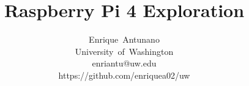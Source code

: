 \documentclass[journal]{IEEEtran}
\begin{document}
    \title{Raspberry Pi 4 Exploration}

    \author{Enrique~Antunano\\University~of~Washington\\enriantu@uw.edu\\https://github.com/enriquea02/uw}


    \maketitle

    
\end{document}
